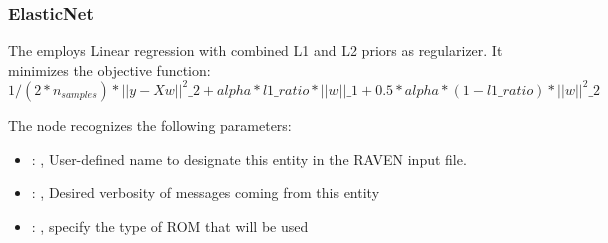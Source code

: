 \subsubsection{ElasticNet}
  The  employs                         Linear regression with combined L1 and L2
  priors as regularizer.                         It minimizes the objective function:
  \begin{equation}                         1/(2*n_{samples}) *||y - Xw||^2\_2+alpha*l1\_ratio*||w||\_1
  + 0.5 *alpha*(1 - l1\_ratio)*||w||^2\_2                         \end{equation}

  The  node recognizes the following parameters:
    \begin{itemize}
      \item {}: ,
        User-defined name to designate this entity in the RAVEN input file.
      \item {}: ,
        Desired verbosity of messages coming from this entity
      \item {}: ,
        specify the type of ROM that will be used
  \end{itemize}

